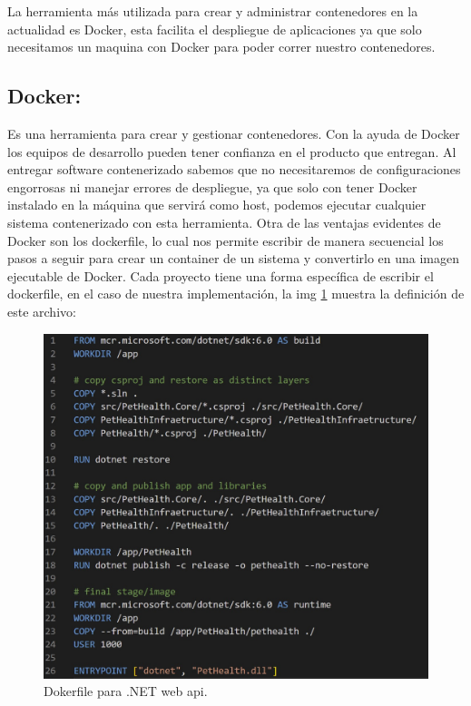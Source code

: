 La herramienta más utilizada para crear y administrar contenedores en la actualidad es Docker, esta facilita el despliegue de aplicaciones ya que solo necesitamos un maquina con Docker para poder correr nuestro contenedores.

\subsection{Docker:}

Es una herramienta para crear y gestionar contenedores. Con la ayuda de Docker los equipos de desarrollo pueden tener confianza en el producto que entregan. Al entregar software contenerizado sabemos que no necesitaremos de configuraciones engorrosas ni manejar errores de despliegue, ya que solo con  tener Docker instalado en la máquina que servirá como host, podemos ejecutar cualquier sistema contenerizado con esta herramienta. Otra de las ventajas evidentes de Docker son los dockerfile, lo cual nos permite escribir de manera secuencial los pasos a seguir para crear un container de un sistema y convertirlo en una imagen ejecutable de Docker. Cada proyecto tiene una forma específica de escribir el dockerfile, en el caso de nuestra implementación, la img \ref{fig:dockerfile} muestra la definición de este archivo:
\newline
\begin{figure}
	\centering
	\includegraphics[width = 14cm]{Graphics/dokerfile.jpg}
	\caption{Dokerfile para .NET web api. }
	\label{fig:dockerfile}
\end{figure}

